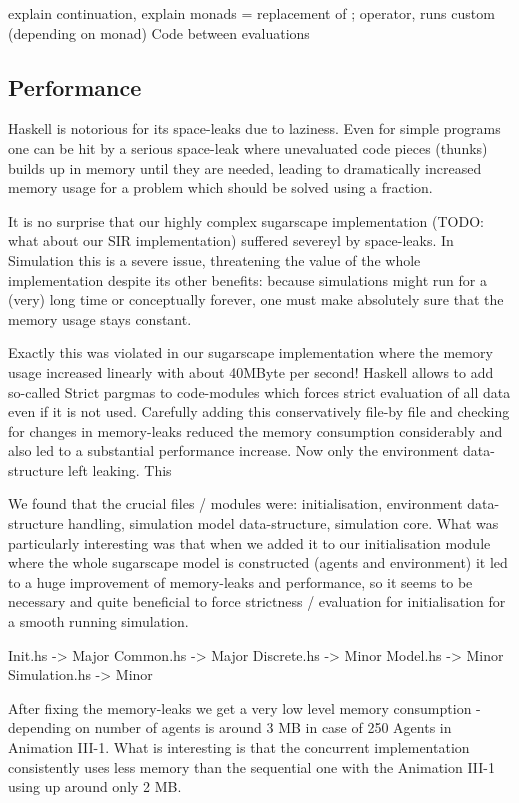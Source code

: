 explain continuation, explain monads = replacement of ; operator, runs custom (depending on monad) Code between evaluations

\subsection{Performance}
Haskell is notorious for its space-leaks due to laziness. Even for simple programs one can be hit by a serious space-leak where unevaluated code pieces (thunks) builds up in memory until they are needed, leading to dramatically increased memory usage for a problem which should be solved using a fraction.

It is no surprise that our highly complex sugarscape implementation (TODO: what about our SIR implementation) suffered severeyl by space-leaks. In Simulation this is a severe issue, threatening the value of the whole implementation despite its other benefits: because simulations might run for a (very) long time or conceptually forever, one must make absolutely sure that the memory usage stays constant.

Exactly this was violated in our sugarscape implementation where the memory usage increased linearly with about 40MByte per second! 
Haskell allows to add so-called Strict pargmas to code-modules which forces strict evaluation of all data even if it is not used. Carefully adding this conservatively file-by file and checking for changes in memory-leaks reduced the memory consumption considerably and also led to a substantial performance increase. Now only the environment data-structure left leaking. This 

We found that the crucial files / modules were: initialisation, environment data-structure handling, simulation model data-structure, simulation core. What was particularly interesting was that when we added it to our initialisation module where the whole sugarscape model is constructed (agents and environment) it led to a huge improvement of memory-leaks and performance, so it seems to be necessary and quite beneficial to force strictness / evaluation for initialisation for a smooth running simulation.

Init.hs       -> Major
Common.hs	  -> Major
Discrete.hs	  -> Minor
Model.hs	  -> Minor
Simulation.hs -> Minor

After fixing the memory-leaks we get a very low level memory consumption - depending on number of agents is around 3 MB in case of 250 Agents in Animation III-1. What is interesting is that the concurrent implementation consistently uses less memory than the sequential one with the Animation III-1 using up around only 2 MB.

